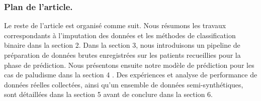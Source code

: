 \subsubsection{Plan de l’article.}
Le reste de l’article est organisé comme suit. Nous résumons les travaux correspondants à l’imputation des données et les méthodes de classification binaire dans la section 2. Dans la section 3, nous introduisons un pipeline de préparation de données brutes enregistrées sur les patients recueillies pour la phase de prédiction. Nous présentons ensuite notre modèle de prédiction pour les cas de paludisme dans la section 4 . Des expériences et analyse de performance de données réelles collectées, ainsi qu’un ensemble de données semi-synthétiques, sont détaillées dans la section 5 avant de conclure dans la section 6.
 
